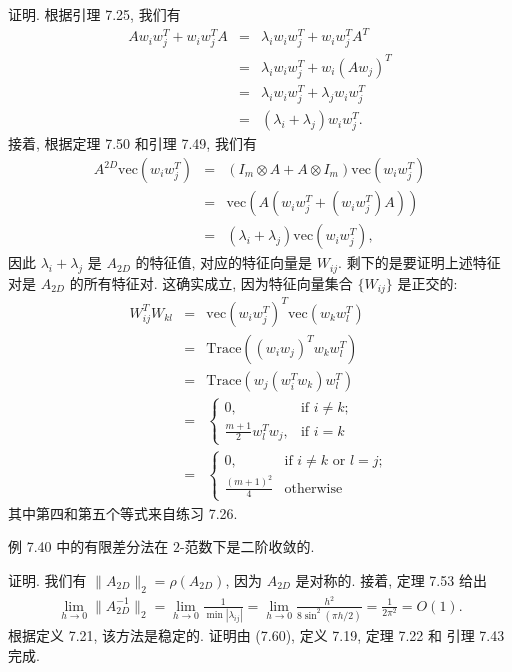 \documentclass[a4paper]{ctexart}
\newcommand{\hl}[1]
{\noindent {\bf {#1}}}
\begin{document}
证明. 根据引理 7.25, 我们有
\begin{eqnarray*}
A w_i w_j^T + w_i w_j^T A 
&=& \lambda_i w_i w_j^T + w_i w_j^T A^T \\ 
&=& \lambda_i w_i w_j^T + w_i (A w_j)^T \\
&=& \lambda_i w_i w_j^T + \lambda_j w_i w_j^T \\ 
&=& (\lambda_i + \lambda_j) w_i w_j^T. 
\end{eqnarray*}
接着, 根据定理 7.50 和引理 7.49, 我们有
\begin{eqnarray*}
A^{2D} \mathrm{vec} (w_i w_j^T) 
&=& (I_m \otimes A + A \otimes I_m) \mathrm{vec} (w_i w_j^T) \\
&=& \mathrm{vec} (A(w_i w_j^T + (w_i w_j^T)A)) \\ 
&=& (\lambda_i + \lambda_j) \mathrm{vec} (w_i w_j^T),
\end{eqnarray*}
因此 $\lambda_i + \lambda_j$ 是 $A_{2D}$ 的特征值, 
对应的特征向量是 $W_{ij}$.
剩下的是要证明上述特征对是 $A_{2D}$ 的所有特征对. 
这确实成立, 因为特征向量集合 $\{W_{ij}\}$ 是正交的:
\begin{eqnarray*}
W_{ij}^T W_{kl} 
&=& \mathrm{vec} (w_i w_j^T)^T \mathrm{vec} (w_k w_l^T)\\ 
&=& \mathrm{Trace} \left( (w_i w_j)^T w_k w_l^T \right)\\ 
&=& \mathrm{Trace} \left( w_j (w_i^T w_k) w_l^T \right)\\ 
&=& \begin{cases} 0, & \text{if } i \neq k; \\ 
  \frac{m + 1}{2} w_l^T w_j, & \text{if } i = k \end{cases}\\ 
&=& \begin{cases} 0, & \text{if } i \neq k \text{ or } l = j; \\ 
  \frac{(m+1)^2}{4}  & \text{otherwise} \end{cases} 
\end{eqnarray*}
其中第四和第五个等式来自练习 7.26.

\hl{定理7.54} 例 7.40 中的有限差分法在 $2$-范数下是二阶收敛的.

证明. 我们有 $\|A_{2D}\|_2 = \rho(A_{2D})$, 因为 $A_{2D}$ 是对称的.
接着, 定理 7.53 给出
\begin{eqnarray*}
\lim_{h \to 0} \|A^{-1}_{2D}\|_2 
= \lim_{h \to 0} \frac{1}{\min |\lambda_{ij}|} 
= \lim_{h \to 0} \frac{h^2}{8 \sin^2 (\pi h/2)} = \frac{1}{2\pi^2} = O(1).
\end{eqnarray*}
根据定义 7.21, 该方法是稳定的. 证明由 (7.60), 定义 7.19, 定理 7.22 和 引理 7.43 完成.
\end{document}
